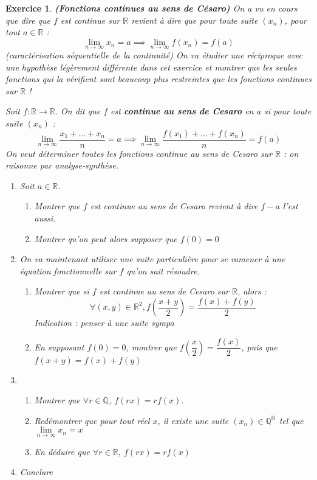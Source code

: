 \documentclass[a4paper,11pt]{article}
\newtheorem{exer}{Exercice} %
\begin{document}
\begin{exer}{\textbf{(Fonctions continues au sens de Césaro)}} \newline
\textit{On a vu en cours que dire que $f$ est continue sur $\mathbb{R}$ revient à dire que pour toute suite $(x_n)$, pour tout $a \in \mathbb{R}$ :
$$ \lim\limits_{n \to \infty} x_n = a \implies \lim\limits_{n \to \infty} f(x_n) = f(a) $$ (caractérisation séquentielle de la continuité) \newline \newline
On va étudier une réciproque avec une hypothèse légèrement différente dans cet exercice et montrer que les seules fonctions qui la vérifient sont beaucoup plus restreintes que les fonctions continues sur $\mathbb{R}$ !
}


Soit $f : \mathbb{R} \longrightarrow \mathbb{R}$. On dit que $f$ est \textbf{continue au sens de Cesaro} en $a$ si pour toute suite $(x_n)$ :
$$ \lim\limits_{n \to \infty} \dfrac{x_1+...+x_n}{n} = a \implies \lim\limits_{n \to \infty} \dfrac{f(x_1)+...+f(x_n)}{n} = f(a) $$
On veut déterminer toutes les fonctions continue au sens de Cesaro sur $\mathbb{R}$ : on raisonne par analyse-synthèse.
\begin{enumerate}
\item Soit $a \in \mathbb{R}$. 

\begin{enumerate}
\item Montrer que $f$ est continue au sens de Cesaro revient à dire $f-a$ l'est aussi. 
\item Montrer qu'on peut alors supposer que $f(0) = 0$
\end{enumerate}
\item On va maintenant utiliser une suite particulière pour se ramener à une équation fonctionnelle sur $f$ qu'on sait résoudre.
\begin{enumerate}
\item Montrer que si $f$ est continue au sens de Cesaro sur $\mathbb{R}$, alors :
$$\forall (x,y) \in \mathbb{R}^2, f \left( \dfrac{x+y}{2} \right) = \dfrac{f(x) + f(y)}{2}$$ \newline
\textit{Indication :} penser à une suite sympa
\item En supposant $f(0) = 0$, montrer que $f \left( \dfrac{x}{2} \right) = \dfrac{f(x)}{2}$, puis que $f(x+y) = f(x) + f(y)$
\end{enumerate}
\item 
\begin{enumerate}
\item Montrer que $\forall r \in \mathbb{Q}$, $f(rx) = rf(x)$. 
\item Redémontrer que pour tout réel $x$, il existe une suite $(x_n) \in \mathbb{Q}^{\mathbb{N}}$ tel que $\lim\limits_{n \to \infty} x_n = x$
\item En déduire que $\forall r \in \mathbb{R}$, $f(rx) = rf(x)$
\end{enumerate}
\item Conclure
\end{enumerate}
\end{exer}
\end{document}
